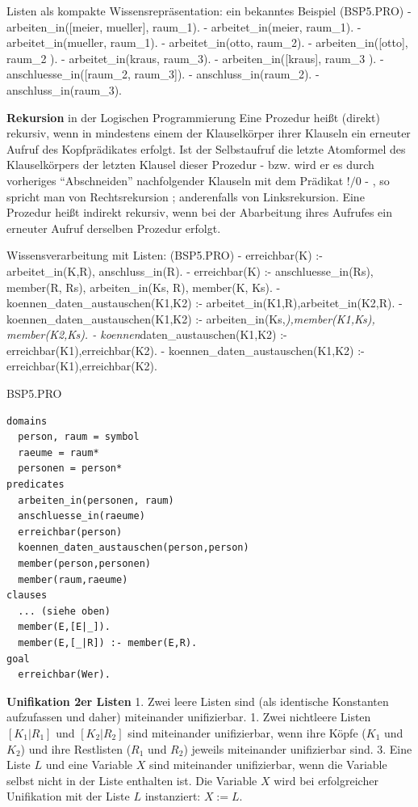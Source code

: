 \documentclass[a4paper]{article}
\begin{document}
\begin{multicols}{3}
  Listen als kompakte Wissensrepräsentation: ein bekanntes Beispiel
  (BSP5.PRO) - arbeiten\_in({[}meier, mueller{]}, raum\_1). -
  arbeitet\_in(meier, raum\_1). - arbeitet\_in(mueller, raum\_1). -
  arbeitet\_in(otto, raum\_2). - arbeiten\_in({[}otto{]}, raum\_2 ). -
  arbeitet\_in(kraus, raum\_3). - arbeiten\_in({[}kraus{]}, raum\_3 ). -
  anschluesse\_in({[}raum\_2, raum\_3{]}). - anschluss\_in(raum\_2). -
  anschluss\_in(raum\_3).

  \textbf{Rekursion} in der Logischen Programmierung Eine Prozedur heißt
  (direkt) rekursiv, wenn in mindestens einem der Klauselkörper ihrer
  Klauseln ein erneuter Aufruf des Kopfprädikates erfolgt. Ist der
  Selbstaufruf die letzte Atomformel des Klauselkörpers der letzten
  Klausel dieser Prozedur - bzw. wird er es durch vorheriges
  ``Abschneiden'' nachfolgender Klauseln mit dem Prädikat $!/0$ - , so
  spricht man von Rechtsrekursion ; anderenfalls von Linksrekursion. Eine
  Prozedur heißt indirekt rekursiv, wenn bei der Abarbeitung ihres
  Aufrufes ein erneuter Aufruf derselben Prozedur erfolgt.

  Wissensverarbeitung mit Listen: (BSP5.PRO) - erreichbar(K) :-
  arbeitet\_in(K,R), anschluss\_in(R). - erreichbar(K) :-
  anschluesse\_in(Rs), member(R, Rs), arbeiten\_in(Ks, R), member(K, Ks).
  - koennen\_daten\_austauschen(K1,K2) :-
  arbeitet\_in(K1,R),arbeitet\_in(K2,R). -
  koennen\_daten\_austauschen(K1,K2) :-
  arbeiten\_in(Ks,\emph{),member(K1,Ks), member(K2,Ks). -
  koennen}daten\_austauschen(K1,K2) :- erreichbar(K1),erreichbar(K2). -
  koennen\_daten\_austauschen(K1,K2) :- erreichbar(K1),erreichbar(K2).

  BSP5.PRO

  \begin{verbatim}
domains
  person, raum = symbol
  raeume = raum*
  personen = person*
predicates
  arbeiten_in(personen, raum)
  anschluesse_in(raeume)
  erreichbar(person)
  koennen_daten_austauschen(person,person)
  member(person,personen)
  member(raum,raeume)
clauses
  ... (siehe oben)
  member(E,[E|_]).
  member(E,[_|R]) :- member(E,R).
goal
  erreichbar(Wer).
\end{verbatim}

  \textbf{Unifikation 2er Listen} 1. Zwei leere Listen sind (als
  identische Konstanten aufzufassen und daher) miteinander unifizierbar.
  1. Zwei nichtleere Listen $[K_1|R_1]$ und $[K_2|R_2]$ sind miteinander
  unifizierbar, wenn ihre Köpfe ($K_1$ und $K_2$) und ihre Restlisten
  ($R_1$ und $R_2$) jeweils miteinander unifizierbar sind. 3. Eine Liste
  $L$ und eine Variable $X$ sind miteinander unifizierbar, wenn die
  Variable selbst nicht in der Liste enthalten ist. Die Variable $X$ wird
  bei erfolgreicher Unifikation mit der Liste $L$ instanziert: $X:=L$.


\end{multicols}
\end{document}
